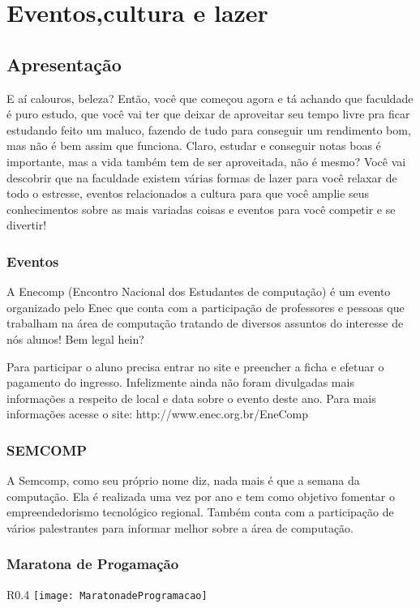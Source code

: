 \chapter{Eventos,cultura e lazer}
\DoPToC
\section{Apresentação}

E aí calouros, beleza? Então, você que começou agora e tá achando que faculdade é puro estudo, que você vai ter que deixar de aproveitar seu tempo livre pra ficar estudando feito um maluco, fazendo de tudo para conseguir um rendimento bom, mas não é bem assim que funciona. Claro, estudar e conseguir notas boas é importante, mas a vida também tem de ser aproveitada, não é mesmo? Você vai descobrir que na faculdade existem várias formas de lazer para você relaxar de todo o estresse, eventos relacionados a cultura para que você amplie seus conhecimentos sobre as mais variadas coisas e eventos para você competir e se divertir!     

\subsection{Eventos} 

A Enecomp (Encontro Nacional dos Estudantes de computação) é um evento organizado pelo Enec que conta com a participação de professores e pessoas que trabalham na área de computação tratando de diversos assuntos do interesse de nós alunos! Bem legal hein?

Para participar o aluno precisa entrar no site e preencher a ficha e efetuar o pagamento do ingresso. Infelizmente ainda não foram divulgadas mais informações a respeito de local e data sobre o evento deste ano. Para mais informações acesse o site: http://www.enec.org.br/EneComp

\subsection {SEMCOMP}
A Semcomp, como seu próprio nome diz, nada mais é que a semana da computação. Ela é realizada uma vez por ano e tem como objetivo fomentar o empreendedorismo tecnológico regional. Também conta com a participação de vários palestrantes para informar melhor sobre a área de computação. 

\subsection {Maratona de Progamação}
                \begin{wrapfigure}{R}{0.4\textwidth}
	                    \centering
                        \texttt{[image: MaratonadeProgramacao]}
                     \end{wrapfigure}  

